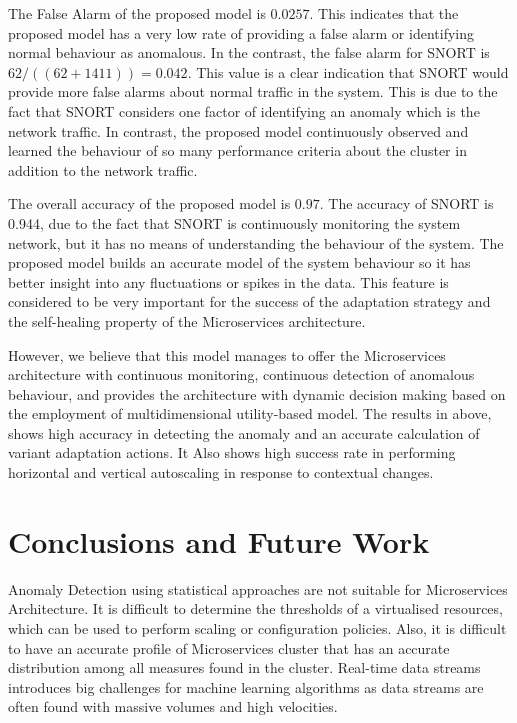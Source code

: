 \documentclass[sigconf]{acmart}
\begin{document}
The False Alarm of the proposed model  is $0.0257$. This indicates that the proposed model has a very low rate of providing a false alarm or identifying normal behaviour as anomalous. In the contrast, the false alarm for SNORT is $62/((62+1411))=0.042$. This value is a clear indication that SNORT would provide more false alarms about normal traffic in the system. This is due to the fact that SNORT considers one factor of identifying an anomaly which is the network traffic. In contrast, the proposed model continuously observed and learned the behaviour of so many performance criteria about the cluster in addition to the network traffic. 




The overall accuracy of the proposed model is $0.97$. The accuracy of SNORT is 0.944, due to the fact that SNORT is continuously monitoring the system network, but it has no means of understanding the behaviour of the system. The proposed model builds an accurate model of the system behaviour so it has better insight into any fluctuations or spikes in the data. This feature is considered to be very important for the success of the adaptation strategy and the self-healing property of the Microservices architecture. 

However, we believe that this model manages to offer the Microservices architecture with continuous monitoring, continuous detection of anomalous behaviour, and provides the architecture with dynamic decision making based on the employment of multidimensional utility-based model. The results in above, shows high accuracy in detecting the anomaly and an accurate calculation of variant adaptation actions. It Also shows high success rate in performing horizontal and vertical autoscaling in response to contextual changes. 


 \section{Conclusions and Future Work}\label{sec:Conclusion}
 Anomaly Detection using statistical approaches are not suitable for Microservices Architecture. It is difficult to determine the thresholds of a virtualised resources, which can be used to perform scaling or configuration policies. 
Also, it is difficult to have an accurate profile of Microservices cluster that has an accurate distribution among all measures found in the cluster. Real-time data streams introduces big challenges for machine learning algorithms as data streams are often found with massive volumes and high velocities. 
\end{document}
